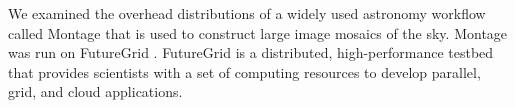 We examined the overhead distributions of a widely used astronomy workflow called Montage \cite{Berriman2004} that is used to construct large image mosaics of the sky. Montage was run on FutureGrid \cite{FutureGrid}. FutureGrid is a distributed, high-performance testbed that provides scientists with a set of computing resources to develop parallel, grid, and cloud applications. 




